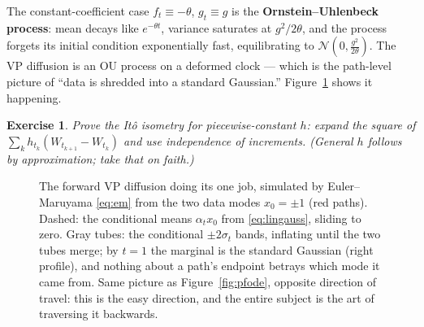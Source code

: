 \documentclass[10pt,a4paper]{article}
\newtheorem{exercise}{Exercise}
\begin{document}
The constant-coefficient case $f_t \equiv -\theta$, $g_t \equiv g$ is the
\textbf{Ornstein--Uhlenbeck process}: mean decays like $e^{-\theta t}$,
variance saturates at $g^2/2\theta$, and the process forgets its initial
condition exponentially fast, equilibrating to
$\mathcal{N}(0, \tfrac{g^2}{2\theta})$. The VP diffusion is an OU process
on a deformed clock --- which is the path-level picture of ``data is
shredded into a standard Gaussian.'' Figure~\ref{fig:ou} shows it
happening.

\begin{exercise}
\label{ex:isometry}
Prove the It\^o isometry for piecewise-constant $h$: expand the square
of $\sum_k h_{t_k} (W_{t_{k+1}} - W_{t_k})$ and use independence of
increments. (General $h$ follows by approximation; take that on faith.)
\end{exercise}

\begin{figure}[t]
\centering
{}
\caption{The forward VP diffusion doing its one job, simulated by
Euler--Maruyama \eqref{eq:em} from the two data modes $x_0 = \pm 1$
(red paths). Dashed: the conditional means $\alpha_t x_0$ from
\eqref{eq:lingauss}, sliding to zero. Gray tubes: the conditional
$\pm 2\sigma_t$ bands, inflating until the two tubes merge; by $t = 1$
the marginal is the standard Gaussian (right profile), and nothing about
a path's endpoint betrays which mode it came from. Same picture as
Figure~\ref{fig:pfode}, opposite direction of travel: this is the easy
direction, and the entire subject is the art of traversing it backwards.}
\label{fig:ou}
\end{figure}
\end{document}
